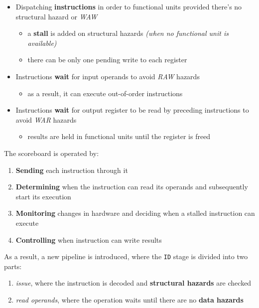 \documentclass[english]{article}
\begin{document}
\begin{itemize}
  \item Dispatching \textbf{instructions} in order to functional units provided there's no structural hazard or \textit{WAW}
        \begin{itemize}
          \item a \textbf{stall} is added on structural hazards \textit{(when no functional unit is available)}
          \item there can be only one pending write to each register
        \end{itemize}
  \item Instructions \textbf{wait} for input operands to avoid \textit{RAW} hazards
        \begin{itemize}
          \item as a result, it can execute out-of-order instructions
        \end{itemize}
  \item Instructions \textbf{wait} for output register to be read by preceding instructions to avoid \textit{WAR} hazards
        \begin{itemize}
          \item results are held in functional units until the register is freed
        \end{itemize}
\end{itemize}

\bigskip
The scoreboard is operated by:

\begin{enumerate}
  \item \textbf{Sending} each instruction through it
  \item \textbf{Determining} when the instruction can read its operands and subsequently start its execution
  \item \textbf{Monitoring} changes in hardware and deciding when a stalled instruction can execute
  \item \textbf{Controlling} when instruction can write results
\end{enumerate}

As a result, a new pipeline is introduced, where the \texttt{ID} stage is divided into two parts:
\begin{enumerate}
  \item \textit{issue}, where the instruction is decoded and \textbf{structural hazards} are checked
  \item \textit{read operands}, where the operation waits until there are no \textbf{data hazards}
\end{enumerate}
\end{document}
